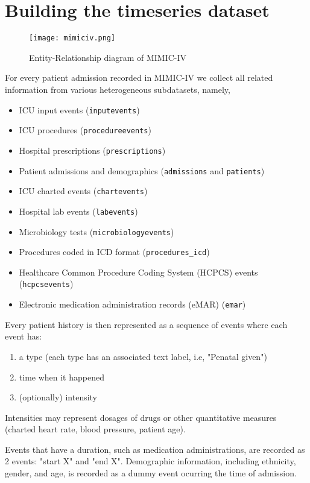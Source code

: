 \newpage
\section{Building the timeseries dataset}

\begin{figure}
    \centering
    \texttt{[image: mimiciv.png]}
    \caption{Entity-Relationship diagram of MIMIC-IV}
    \label{fig:mimic}
\end{figure}

For every patient admission recorded in MIMIC-IV we collect all related information from various heterogeneous subdatasets, namely,

\begin{itemize}
    \item ICU input events (\texttt{inputevents})
    \item ICU procedures (\texttt{procedureevents})
    \item Hospital prescriptions (\texttt{prescriptions})
    \item Patient admissions and demographics (\texttt{admissions} and \texttt{patients})
    \item ICU charted events (\texttt{chartevents})
    \item Hospital lab events (\texttt{labevents})
    \item Microbiology tests (\texttt{microbiologyevents})
    \item Procedures coded in ICD format (\texttt{procedures\_icd})
    \item Healthcare Common Procedure Coding System (HCPCS) events (\texttt{hcpcsevents})
    \item Electronic medication administration records (eMAR) (\texttt{emar})
\end{itemize}

Every patient history is then represented as a sequence of events where each event has:
\begin{enumerate}
    \item a type (each type has an associated text label, i.e, "Penatal given")
    \item time when it happened
    \item (optionally) intensity
\end{enumerate}

Intensities may represent dosages of drugs or other quantitative measures (charted heart rate, blood pressure, patient age).

Events that have a duration, such as medication administrations, are recorded as 2 events: "start X" and "end X". 
Demographic information, including ethnicity, gender, and age, is recorded as a dummy event ocurring the time of admission.


